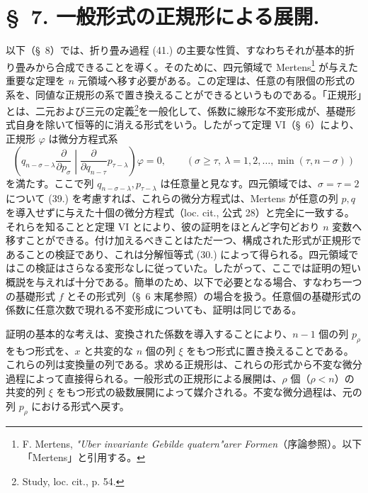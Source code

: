 \documentclass[11pt]{jlreq}
\begin{document}
\section*{\S\ 7. 一般形式の正規形による展開.}
以下（\S\ 8）では、折り畳み過程 (41.) の主要な性質、すなわちそれが基本的折り畳みから合成できることを導く。そのために、四元領域で Mertens\footnote{F. Mertens, \emph{"Uber invariante Gebilde quatern"arer Formen}（序論参照）。以下「Mertens」と引用する。} が与えた重要な定理を $n$ 元領域へ移す必要がある。この定理は、任意の有限個の形式の系を、同値な正規形の系で置き換えることができるというものである。「正規形」とは、二元および三元の定義\footnote{Study, loc. cit., p. 54.}を一般化して、係数に線形な不変形成が、基礎形式自身を除いて恒等的に消える形式をいう。したがって定理 VI（\S\ 6）により、正規形 $\varphi$ は微分方程式系
\begin{equation}
 \left(q_{n-\sigma-\lambda}\frac{\partial}{\partial p_\sigma}\middle|\frac{\partial}{\partial q_{n-\tau}}p_{\tau-\lambda}\right)\varphi=0,
 \qquad(\sigma\ge\tau,\ \lambda=1,2,\ldots,\min(\tau,n-\sigma))
\tag{46}
\end{equation}
を満たす。ここで列 $q_{n-\sigma-\lambda},p_{\tau-\lambda}$ は任意量と見なす。四元領域では、$\sigma=\tau=2$ について (39.) を考慮すれば、これらの微分方程式は、Mertens が任意の列 $p,q$ を導入せずに与えた十個の微分方程式（loc. cit., 公式 28）と完全に一致する。それらを知ることと定理 VI とにより、彼の証明をほとんど字句どおり $n$ 変数へ移すことができる。付け加えるべきことはただ一つ、構成された形式が正規形であることの検証であり、これは分解恒等式 (30.) によって得られる。四元領域ではこの検証はさらなる変形なしに従っていた。したがって、ここでは証明の短い概説を与えれば十分である。簡単のため、以下で必要となる場合、すなわち一つの基礎形式 $f$ とその形式列（\S\ 6 末尾参照）の場合を扱う。任意個の基礎形式の係数に任意次数で現れる不変形成についても、証明は同じである。

証明の基本的な考えは、変換された係数を導入することにより、$n-1$ 個の列 $p_\rho$ をもつ形式を、$x$ と共変的な $n$ 個の列 $\xi$ をもつ形式に置き換えることである。これらの列は変換量の列である。求める正規形は、これらの形式から不変な微分過程によって直接得られる。一般形式の正規形による展開は、$\rho$ 個（$\rho<n$）の共変的列 $\xi$ をもつ形式の級数展開によって媒介される。不変な微分過程は、元の列 $p_\rho$ における形式へ戻す。
\end{document}
